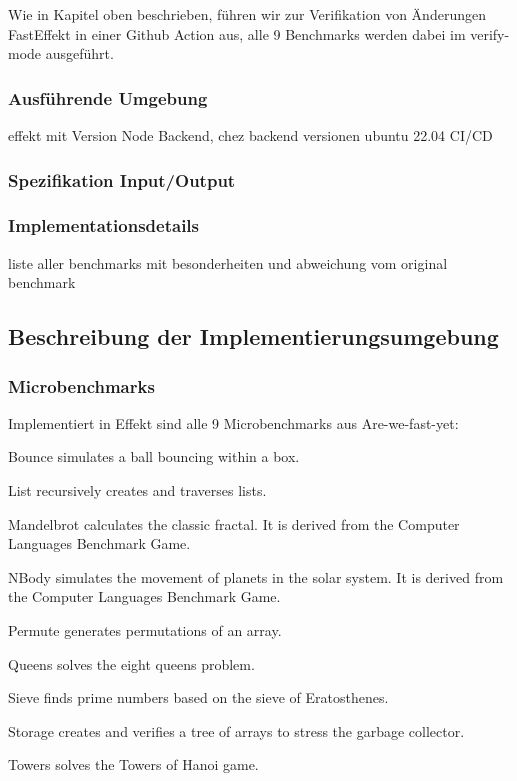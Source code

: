 Wie in %
Kapitel oben beschrieben, führen wir zur Verifikation von Änderungen FastEffekt in einer Github Action aus, alle 9 Benchmarks werden dabei im verify-mode ausgeführt.

\subsubsection{Ausführende Umgebung}
effekt mit Version
Node Backend, chez backend versionen
ubuntu 22.04 
CI/CD 

\subsubsection{Spezifikation Input/Output}

\subsubsection{Implementationsdetails}
liste aller benchmarks mit besonderheiten und abweichung vom original benchmark



\subsection{Beschreibung der Implementierungsumgebung}

\subsubsection{ Microbenchmarks }
Implementiert in Effekt sind alle 9 Microbenchmarks aus Are-we-fast-yet:

Bounce simulates a ball bouncing within a box.

List recursively creates and traverses lists.

Mandelbrot calculates the classic fractal. It is derived from the Computer Languages Benchmark Game.

NBody simulates the movement of planets in the solar system. It is derived from the Computer Languages Benchmark Game.

Permute generates permutations of an array.

Queens solves the eight queens problem.

Sieve finds prime numbers based on the sieve of Eratosthenes.

Storage creates and verifies a tree of arrays to stress the garbage collector.

Towers solves the Towers of Hanoi game.

